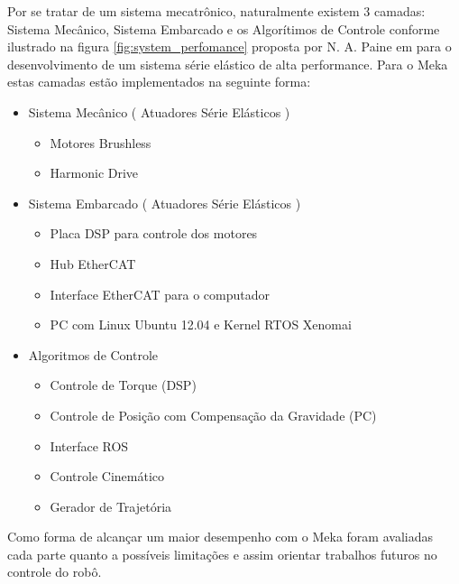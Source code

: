 Por se tratar de um sistema mecatrônico, naturalmente existem 3 camadas: Sistema Mecânico, Sistema Embarcado e os Algorítimos de Controle conforme ilustrado na figura \ref{fig:system_perfomance} proposta por N. A. Paine em \cite{paine2014high} para o desenvolvimento de um sistema série elástico de alta performance. Para o Meka estas camadas estão implementados na seguinte forma:

\begin{itemize}
    \item Sistema Mecânico ( Atuadores Série Elásticos )
    \begin{itemize}
        \item Motores Brushless
        \item Harmonic Drive
    \end{itemize}
    \item Sistema Embarcado ( Atuadores Série Elásticos )
    \begin{itemize}
        \item Placa DSP para controle dos motores
        \item Hub EtherCAT
        \item Interface EtherCAT para o computador
        \item PC com Linux Ubuntu 12.04 e Kernel RTOS Xenomai
    \end{itemize}
    \item Algoritmos de Controle
    \begin{itemize}
        \item Controle de Torque (DSP)
        \item Controle de Posição com Compensação da Gravidade (PC)
        \item Interface ROS
        \item Controle Cinemático
        \item Gerador de Trajetória
    \end{itemize}
\end{itemize}

Como forma de alcançar um maior desempenho com o Meka foram avaliadas cada parte quanto a possíveis limitações e assim orientar trabalhos futuros no controle do robô.




